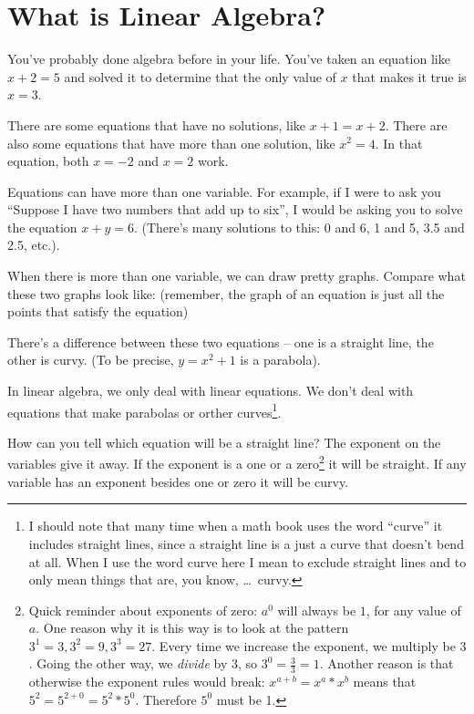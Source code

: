 \documentclass[a4paper,twoside,12pt]{memoir}  %
\begin{document}
\section{What is Linear Algebra?}
You've probably done algebra before in your life.
You've taken an equation like $x + 2 = 5$ and solved it to determine that
the only value of $x$ that makes it true is $x = 3$.

There are some equations that have no solutions, like $x + 1 = x + 2$.
There are also some equations that have more than one solution, like $x^2 = 4$.
In that equation, both $x = -2$ and $x = 2$ work.

Equations can have more than one variable.
For example, if I were to ask you ``Suppose I have two numbers that add up to six'', I would be asking you
to solve the equation $x + y = 6$. (There's many solutions to this: 0 and 6, 1 and 5, 3.5 and 2.5, etc.).

When there is more than one variable, we can draw pretty graphs.
Compare what these two graphs look like: (remember, the graph of an equation is just all the points that satisfy the equation)


There's a difference between these two equations -- one is a straight line, the other is curvy.
(To be precise, $y = x^2 + 1$ is a parabola).

In linear algebra, we only deal with linear equations.
We don't deal with equations that make parabolas or orther curves\footnote{I should note that many time when a math book uses the word ``curve'' it includes straight lines, since a straight line is a just a curve that doesn't bend at all. When I use the word curve here I mean to exclude straight lines and to only mean things that are, you know, \ldots\ curvy.}.

How can you tell which equation will be a straight line? The exponent on the variables give it away. If the exponent is a one or a zero\footnote{Quick reminder about exponents of zero: $a^0$ will always be $1$, for any value of $a$. One reason why it is this way is to look at the pattern $3^1 = 3, 3^2 = 9, 3^3 = 27$. Every time we increase the exponent, we multiply be $3$. Going the other way, we \textit{divide} by $3$, so $3^0 = \frac{3}{3} = 1$. Another reason is that otherwise the exponent rules would break: $x^{a+b} = x^a*x^b$ means that $5^2 = 5^{2+0} = 5^2*5^0$. Therefore $5^0$ must be 1.} it will be straight. If any variable has an exponent besides one or zero it will be curvy.
\end{document}
